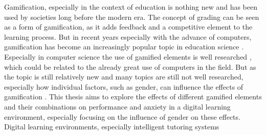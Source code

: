 Gamification, especially in the context of education is nothing new and has been used by societies long before the modern era.
The concept of grading can be seen as a form of gamification, as it adds feedback and a competitive element to the learning process.
But in recent years especially with the advance of computers, gamification has become an increasingly popular topic in education science \parencite{swachaStateResearchGamification2021}.
Especially in computer science the use of gamified elements is well researched \parencite{dichevGamifyingEducationWhat2017}, which could be related to the already great use of computers in the field.
But as the topic is still relatively new and many topics are still not well researched, especially how individual factors, such as gender, can influence the effects of gamification \parencite{dehghanzadehUsingGamificationSupport2024,oliveiraTailoredGamificationEducation2023}.
This thesis aims to explore the effects of different gamified elements and their combinations on performance and anxiety in a digital learning environment, especially focusing on the influence of gender on these effects.
Digital learning environments, especially intelligent tutoring systems 